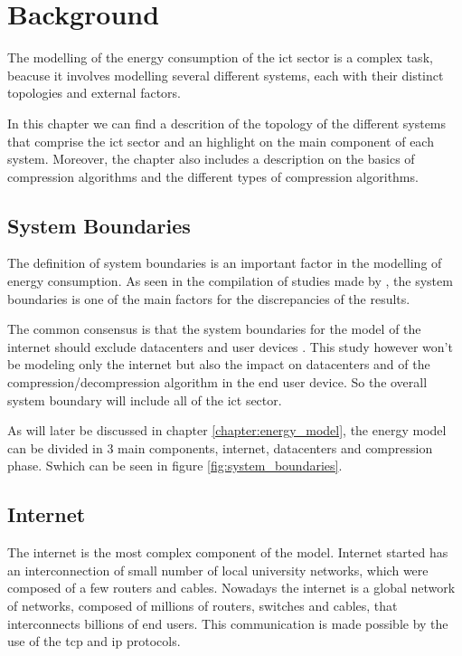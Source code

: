 

\chapter{Background}
\label{chapter:background}

\begin{introduction}
    
    The modelling of the energy consumption of the \ac{ict} sector is a complex task, beacuse it involves modelling several different systems, each with their distinct topologies and external factors.

    In this chapter we can find a descrition of the topology of the different systems that comprise the \ac{ict} sector and an highlight on the main component of each system. Moreover, the chapter also includes a description on the basics of compression algorithms and the different types of compression algorithms.

\end{introduction}

\section{System Boundaries}

The definition of system boundaries is an important factor in the modelling of energy consumption. As seen in the compilation of studies made by \citet{Aslan2018}, the system boundaries is one of the main factors for the discrepancies of the results.

The common consensus is that the system boundaries for the model of the internet should exclude datacenters and user devices \citet{Coroama2014}. This study however won't be modeling only the internet but also the impact on datacenters and of the compression/decompression algorithm in the end user device. So the overall system boundary will include all of the \ac{ict} sector. 

As will later be discussed in chapter \ref{chapter:energy_model}, the energy model can be divided in 3 main components, internet, datacenters and compression phase.
Swhich can be seen in figure \ref{fig:system_boundaries}.

\section{Internet}

The internet is the most complex component of the model.
Internet started has an interconnection of small number of local university networks, which were composed of a few routers and cables. Nowadays the internet is a global network of networks, composed of millions of routers, switches and cables, that interconnects billions of end users. This communication is made possible by the use of the \ac{tcp} and \ac{ip} protocols.

